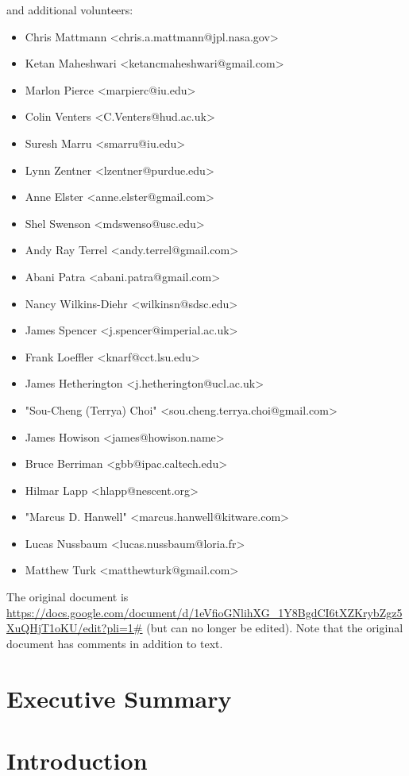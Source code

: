 \documentclass[11pt, oneside]{amsart}
\begin{document}
and additional volunteers:
\begin{itemize}
\item Chris Mattmann <chris.a.mattmann@jpl.nasa.gov>
\item Ketan Maheshwari <ketancmaheshwari@gmail.com>
\item Marlon Pierce <marpierc@iu.edu>
\item Colin Venters <C.Venters@hud.ac.uk>
\item Suresh Marru <smarru@iu.edu>
\item Lynn Zentner <lzentner@purdue.edu>
\item Anne Elster <anne.elster@gmail.com>
\item Shel Swenson <mdswenso@usc.edu>
\item Andy Ray Terrel <andy.terrel@gmail.com>
\item Abani Patra <abani.patra@gmail.com>
\item Nancy Wilkins-Diehr <wilkinsn@sdsc.edu>
\item James Spencer <j.spencer@imperial.ac.uk>
\item Frank Loeffler <knarf@cct.lsu.edu>
\item James Hetherington <j.hetherington@ucl.ac.uk>
\item "Sou-Cheng (Terrya) Choi" <sou.cheng.terrya.choi@gmail.com>
\item James Howison <james@howison.name>
\item Bruce Berriman <gbb@ipac.caltech.edu>
\item Hilmar Lapp <hlapp@nescent.org>
\item "Marcus D. Hanwell" <marcus.hanwell@kitware.com>
\item Lucas Nussbaum <lucas.nussbaum@loria.fr>
\item Matthew Turk <matthewturk@gmail.com>
\end{itemize}

The original document is \url{https://docs.google.com/document/d/1eVfioGNlihXG_1Y8BgdCI6tXZKrybZgz5XuQHjT1oKU/edit?pli=1#} (but can no longer be edited).
Note that the original document has comments in addition to text.


\pagebreak

\section*{Executive Summary}

\pagebreak

\section{Introduction}
\end{document}

